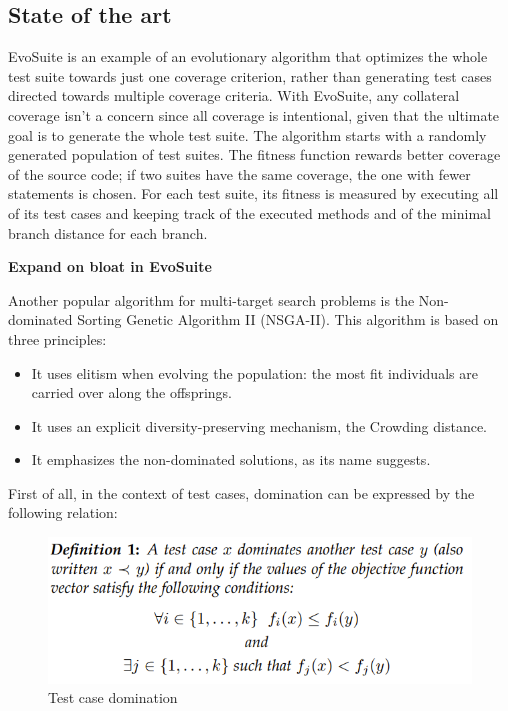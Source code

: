 \subsection*{State of the art}
EvoSuite is an example of an evolutionary algorithm that optimizes the whole test suite towards just one coverage criterion, rather than generating test cases directed towards multiple coverage criteria.
With EvoSuite, any collateral coverage isn't a concern since all coverage is intentional, given that the ultimate goal is to generate the whole test suite.
The algorithm starts with a randomly generated population of test suites.
The fitness function rewards better coverage of the source code; if two suites have the same coverage, the one with fewer statements is chosen. For each test suite, its fitness is measured by executing all of its test cases and keeping track of the executed methods and of the minimal branch distance for each branch.

\textbf{Expand on bloat in EvoSuite}


Another popular algorithm for multi-target search problems is the Non-dominated Sorting Genetic Algorithm II (NSGA-II). This algorithm is based on three principles:

\begin{itemize}
    \item It uses elitism when evolving the population: the most fit individuals are carried over along the offsprings.
    \item It uses an explicit diversity-preserving mechanism, the Crowding distance.
    \item It emphasizes the non-dominated solutions, as its name suggests.
\end{itemize}

First of all, in the context of test cases, domination can be expressed by the following relation:
\begin{figure}[!h]
    \centering
    \includegraphics[scale=0.4]{./figures/test_Case_domination.PNG}
    \caption{Test case domination}
    \label{fig:test case domination}
\end{figure}


